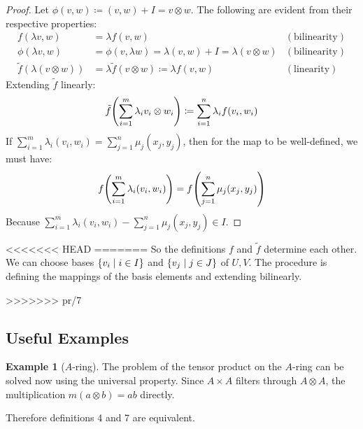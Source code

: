 \documentclass{article}
\theoremstyle{definition}
\newtheorem*{Example*}{Example}
\theoremstyle{remark}
\theoremstyle{underline}
\theoremstyle{underline}
\begin{document}
	\begin{proof}
		Let $\phi(v,w) \coloneqq {(v,w) + I} = {v \otimes w}$. The following are evident from their respective properties:
		\begin{align*}
	    	f(\lambda v, w) & = \lambda f(v,w) & (\text{bilinearity}) \\
	  		\phi(\lambda v, w) & = \phi(v,\lambda w) = \lambda(v, w) + I = \lambda(v \otimes w) & (\text{bilinearity}) \\
	    	\tilde f(\lambda (v\otimes w)) & = \lambda\tilde f(v\otimes w) \coloneqq \lambda f(v,w) & (\text{linearity})
	    \end{align*}
		Extending $\tilde f$ linearly:
		\begin{gather*}
			\tilde f\pqty{\sum_{i=1}^m \lambda_i v_i \otimes w_i } \coloneqq \sum_{i = 1}^n \lambda_i f\pqty{v_i, w_i}
		\end{gather*}
		If $\sum_{i=1}^m \lambda_i (v_i,w_i) = \sum_{j=1}^n \mu_j (x_j,y_j)$, then for the map to be well-defined, we must have:
		\begin{gather*}
			f\pqty{\sum_{i=1}^m \lambda_i (v_i,w_i)} = f\pqty{\sum_{j=1}^n \mu_j (x_j,y_j)} 
		\end{gather*}
		Because $\sum_{i=1}^m \lambda_i (v_i,w_i) - \sum_{j=1}^n \mu_j (x_j,y_j) \in I$.
	\end{proof}

<<<<<<< HEAD
=======
	So the definitions $f$ and $\tilde f$ determine each other. We can choose bases $\qty{v_i \mid i \in I}$ and $\qty{v_j \mid j \in J}$ of $U, V$. The procedure is defining the mappings of the basis elements and extending bilinearly.  

>>>>>>> pr/7
	\subsection{Useful Examples}

	\begin{Example*}[$A$-ring]
		The problem of the tensor product on the $A$-ring can be solved now using the universal property. Since $A \times A$ filters through $A \otimes A$, the multiplication $m(a \otimes b) = ab$ directly.
	\end{Example*}

	Therefore definitions 4 and 7 are equivalent.
	
\end{document}
